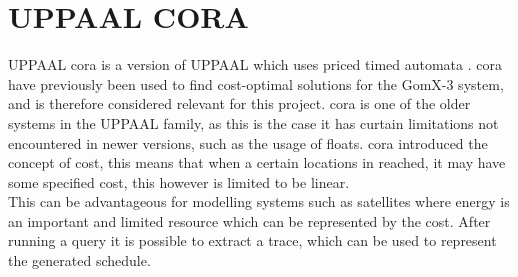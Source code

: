 \section{UPPAAL CORA}
UPPAAL \gls{cora} is a version of UPPAAL which uses priced timed automata \cite{cs_cora}. \Gls{cora} have previously been used to find cost-optimal solutions for the GomX-3 system\cite{gomx3}, and is therefore considered relevant for this project.
\Gls{cora} is one of the older systems in the UPPAAL family, as this is the case it has curtain limitations not encountered in newer versions, such as the usage of floats. 
\Gls{cora} introduced the concept of cost, this means that when a certain locations in reached, it may have some specified cost, this however is limited to be linear. \\
This can be advantageous for modelling systems such as satellites where energy is an important and limited resource which can be represented by the cost. After running a query it is possible to extract a trace, which can be used to represent the generated schedule.